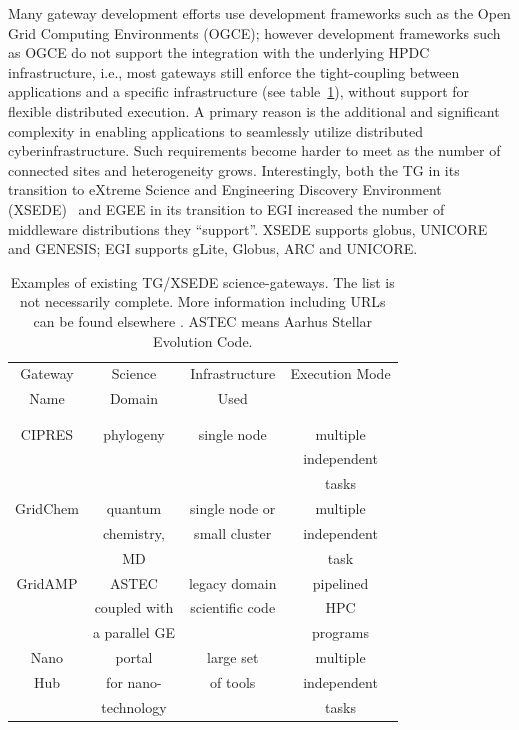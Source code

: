 \documentclass[]{svjour3}
\begin{document}
Many gateway development efforts use development frameworks such as
the Open Grid Computing Environments\cite{ogce-2010} (OGCE); however
development frameworks such as OGCE do not support the integration
with the underlying HPDC infrastructure, i.e., most gateways still
enforce the tight-coupling between applications and a specific
infrastructure (see table~\ref{table:TG-sg}), without support for
flexible distributed execution.  A primary reason is the additional
and significant complexity
in %
enabling applications to seamlessly utilize distributed
cyberinfrastructure. Such requirements become harder to meet as the
number of connected sites and heterogeneity grows. Interestingly, both
the TG in its transition to eXtreme Science and Engineering Discovery
Environment (XSEDE)~\cite{XSEDE} and EGEE in its transition to EGI
increased the number of middleware distributions they ``support''.
XSEDE supports globus, UNICORE and GENESIS; EGI supports gLite,
Globus, ARC and UNICORE.

\begin{table}
\centering
 \small
\begin{tabular}{|c|c|c|c|} 
  \hline Gateway  & Science & Infrastructure & Execution Mode 
  \\
  Name & Domain & Used & \\ 
  &  &  & \\
  & & & \\  \hline \hline 
  
  CIPRES   & phylogeny  &  single node  & multiple  \\
   &  &   & independent   \\ 
  &  &  &  tasks \\  \hline
  GridChem   & quantum & single node or     & multiple  \\
     & chemistry, & small cluster & independent   \\
  & MD &  & task  \\ \hline
   GridAMP     & ASTEC  & legacy domain  & pipelined \\ 
  & coupled with  &  scientific code   & HPC  \\
  & a parallel GE &   &  programs \\ \hline
  Nano  & portal  & large set   & multiple \\
  Hub  & for nano- & of tools  & independent \\
   & technology &  & tasks \\ \hline
  \hline
\end{tabular} \caption{Examples of existing TG/XSEDE science-gateways. The list is not necessarily complete. More information including URLs can be found elsewhere \cite{tg-sg-list-url}. ASTEC means Aarhus Stellar Evolution Code.}
 \label{table:TG-sg} 
\end{table}
\end{document}
